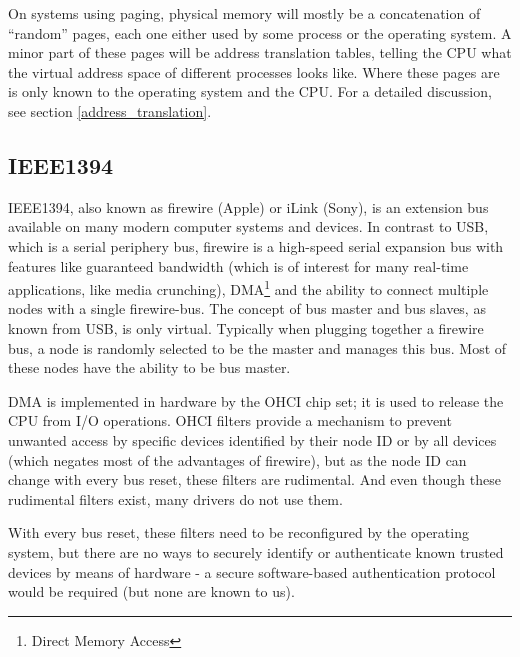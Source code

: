 On systems using paging, physical memory will mostly be a concatenation of
``random'' pages, each one either used by some process or the operating system.
A minor part of these pages will be address translation tables, telling the CPU
what the virtual address space of different processes looks like. Where these
pages are is only known to the operating system and the CPU.  For a detailed
discussion, see section \ref{address_translation}.



\subsection{IEEE1394}

\label{phys1394}
IEEE1394, also known as \epsfysize 0.3cm 
firewire (Apple) or iLink (Sony), is an extension bus available on many modern
computer systems and devices.  In contrast to USB, which is a serial periphery
bus, firewire is a high-speed serial expansion bus with features like guaranteed
bandwidth (which is of interest for many real-time applications, like media
crunching), DMA\footnote{Direct Memory Access} and the ability to connect
multiple nodes with a single firewire-bus.  The concept of bus master and bus
slaves, as known from USB, is only virtual.  Typically when plugging together a
firewire bus, a node is randomly selected to be the master and manages this bus.
Most of these nodes have the ability to be bus master.

DMA is implemented in hardware by the OHCI chip set; it is used to release the
CPU from I/O operations. OHCI filters provide a mechanism to prevent unwanted
access by specific devices identified by their node ID or by all devices (which
negates most of the advantages of firewire), but as the node ID can change with
every bus reset, these filters are rudimental. And even though these rudimental
filters exist, many drivers do not use them.

With every bus reset, these filters need to be reconfigured by the operating
system, but there are no ways to securely identify or authenticate known trusted
devices by means of hardware - a secure software-based authentication protocol
would be required (but none are known to us).

